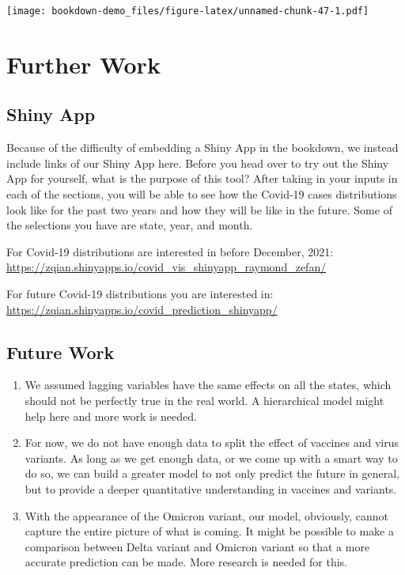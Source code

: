 \documentclass[
]{book}
\begin{document}
\texttt{[image: bookdown-demo\_files/figure-latex/unnamed-chunk-47-1.pdf]}

\hypertarget{further-work}{%
\chapter{Further Work}\label{further-work}}

\hypertarget{shiny-app}{%
\section{Shiny App}\label{shiny-app}}

Because of the difficulty of embedding a Shiny App in the bookdown, we instead include links of our Shiny App here.
Before you head over to try out the Shiny App for yourself, what is the purpose of this tool? After taking in your inputs in each of the sections, you will be able to see how the Covid-19 cases distributions look like for the past two years and how they will be like in the future. Some of the selections you have are state, year, and month.

For Covid-19 distributions are interested in before December, 2021:
\url{https://zqian.shinyapps.io/covid_vis_shinyapp_raymond_zefan/}

For future Covid-19 distributions you are interested in:
\url{https://zqian.shinyapps.io/covid_prediction_shinyapp/}

\hypertarget{future-work}{%
\section{Future Work}\label{future-work}}

\begin{enumerate}
\def\labelenumi{\arabic{enumi}.}
\item
  We assumed lagging variables have the same effects on all the states, which should not be perfectly true in the real world. A hierarchical model might help here and more work is needed.
\item
  For now, we do not have enough data to split the effect of vaccines and virus variants. As long as we get enough data, or we come up with a smart way to do so, we can build a greater model to not only predict the future in general, but to provide a deeper quantitative understanding in vaccines and variants.
\item
  With the appearance of the Omicron variant, our model, obviously, cannot capture the entire picture of what is coming. It might be possible to make a comparison between Delta variant and Omicron variant so that a more accurate prediction can be made. More research is needed for this.
\end{enumerate}
\end{document}
